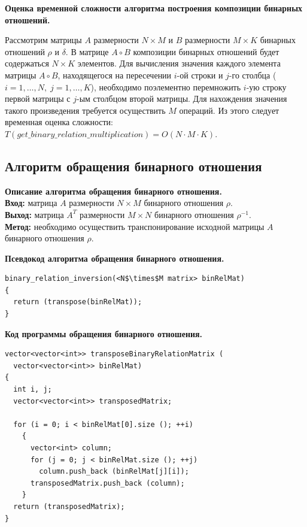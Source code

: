 \documentclass[spec, och, otchet, hidelinks]{SCWorks}
\newcommand{\tbf}[1]{\textbf{#1}}
\begin{document}
\par \tbf{Оценка временной сложности алгоритма построения композиции бинарных
  отношений.} 
\par Рассмотрим матрицы $A$ размерности $N \times M$ и $B$ размерности $M \times
K$ бинарных отношений $\rho$ и $\delta$. В матрице $A \circ B$ композиции
бинарных отношений будет содержаться $N \times K$ элементов. Для вычисления
значения каждого элемента матрицы $A \circ B$, находящегося на пересечении
$i$-ой строки и $j$-го столбца ($i = 1,\dots,N, \; j = 1,\dots,K$), необходимо
поэлементно перемножить $i$-ую строку первой матрицы с $j$-ым столбцом второй
матрицы. Для нахождения значения такого произведения требуется осуществить $M$
операций. Из этого следует временная оценка сложности:
$T(get\_binary\_relation\_multiplication) = O(N \cdot M \cdot K)$.

\newpage

\subsection{Алгоритм обращения бинарного отношения}
\par \tbf{Описание алгоритма обращения бинарного отношения.} \\
\tbf{Вход:} матрица $A$ размерности $N \times M$ бинарного отношения $\rho$. \\
\tbf{Выход:} матрица $A^{T}$ размерности $M \times N$ бинарного отношения
$\rho^{-1}$. \\
\tbf{Метод:} необходимо осуществить транспонирование исходной матрицы $A$
бинарного отношения $\rho$.

\par \tbf{Псевдокод алгоритма обращения бинарного отношения.}
\begin{lstlisting}[caption=Псевдокод алгоритма., mathescape]
binary_relation_inversion(<N$\times$M matrix> binRelMat)
{
  return (transpose(binRelMat));
}
\end{lstlisting}

\par \tbf{Код программы обращения бинарного отношения.}
\begin{lstlisting}[caption=Псевдокод алгоритма., mathescape]
vector<vector<int>> transposeBinaryRelationMatrix (
  vector<vector<int>> binRelMat)
{
  int i, j;
  vector<vector<int>> transposedMatrix;

  for (i = 0; i < binRelMat[0].size (); ++i)
    {
      vector<int> column;
      for (j = 0; j < binRelMat.size (); ++j)
        column.push_back (binRelMat[j][i]);
      transposedMatrix.push_back (column);
    }
  return (transposedMatrix);
}
\end{lstlisting}
\end{document}
